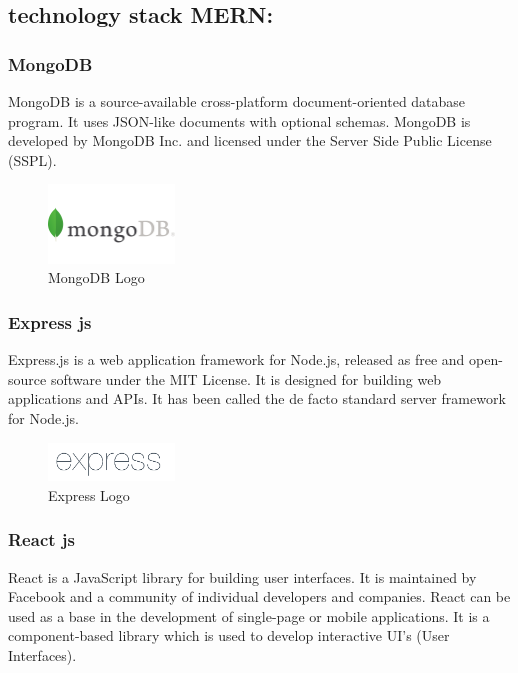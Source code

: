 \bigbreak

\newpage
\subsection{technology stack MERN:}


\subsubsection{MongoDB}
MongoDB is a source-available cross-platform document-oriented database program.
It uses JSON-like documents with optional schemas. MongoDB is developed by
MongoDB Inc. and licensed under the Server Side Public License (SSPL).
\begin{figure}[h!]
      \centering
      \includegraphics[width=0.3\textwidth]{images/mongodb.png}
      \caption{MongoDB Logo}
      \label{fig:mongodb}
\end{figure}

\subsubsection{Express js}
Express.js is a web application framework for Node.js, released as free
and open-source software under the MIT License. It is designed for building
web applications and APIs. It has been called the de facto standard server framework for Node.js.

\begin{figure}[h!]
      \centering
      \includegraphics[width=0.3\textwidth]{images/Expressjs.png}
      \caption{Express Logo}
      \label{fig:express}
\end{figure}
\subsubsection{React js}
React is a JavaScript library for building user interfaces. It is maintained by
Facebook and a community of individual developers and companies. React can be
used as a base in the development of single-page or mobile applications. It is
a component-based library which is used to develop interactive UI's (User
Interfaces).

